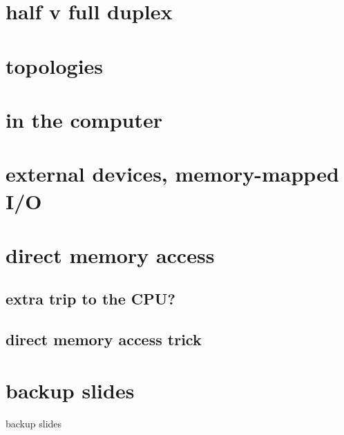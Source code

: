 \date{}
\title{}
\date{}
\usepackage{multirow}

\begin{frame}
    \titlepage
\end{frame}

\section{half v full duplex}



\section{topologies}




\section{in the computer}



\section{external devices, memory-mapped I/O}

\section{direct memory access}

\subsection{extra trip to the CPU?}



\subsection{direct memory access trick}


\section{backup slides}
\begin{frame}{backup slides}
\end{frame}




